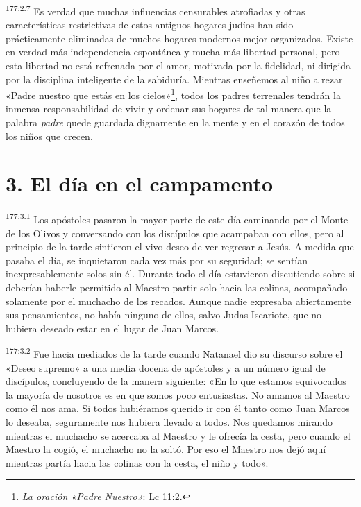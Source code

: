\par
\textsuperscript{177:2.7} Es verdad que muchas influencias censurables atrofiadas y otras características restrictivas de estos antiguos hogares judíos han sido prácticamente eliminadas de muchos hogares modernos mejor organizados. Existe en verdad más independencia espontánea y mucha más libertad personal, pero esta libertad no está refrenada por el amor, motivada por la fidelidad, ni dirigida por la disciplina inteligente de la sabiduría. Mientras enseñemos al niño a rezar «Padre nuestro que estás en los cielos»\footnote{\textit{La oración «Padre Nuestro»}: Lc 11:2.}, todos los padres terrenales tendrán la inmensa responsabilidad de vivir y ordenar sus hogares de tal manera que la palabra \textit{padre} quede guardada dignamente en la mente y en el corazón de todos los niños que crecen.

\section*{3. El día en el campamento}
\par
\textsuperscript{177:3.1} Los apóstoles pasaron la mayor parte de este día caminando por el Monte de los Olivos y conversando con los discípulos que acampaban con ellos, pero al principio de la tarde sintieron el vivo deseo de ver regresar a Jesús. A medida que pasaba el día, se inquietaron cada vez más por su seguridad; se sentían inexpresablemente solos sin él. Durante todo el día estuvieron discutiendo sobre si deberían haberle permitido al Maestro partir solo hacia las colinas, acompañado solamente por el muchacho de los recados. Aunque nadie expresaba abiertamente sus pensamientos, no había ninguno de ellos, salvo Judas Iscariote, que no hubiera deseado estar en el lugar de Juan Marcos.

\par
\textsuperscript{177:3.2} Fue hacia mediados de la tarde cuando Natanael dio su discurso sobre el «Deseo supremo» a una media docena de apóstoles y a un número igual de discípulos, concluyendo de la manera siguiente: «En lo que estamos equivocados la mayoría de nosotros es en que somos poco entusiastas. No amamos al Maestro como él nos ama. Si todos hubiéramos querido ir con él tanto como Juan Marcos lo deseaba, seguramente nos hubiera llevado a todos. Nos quedamos mirando mientras el muchacho se acercaba al Maestro y le ofrecía la cesta, pero cuando el Maestro la cogió, el muchacho no la soltó. Por eso el Maestro nos dejó aquí mientras partía hacia las colinas con la cesta, el niño y todo».

